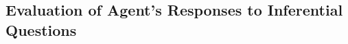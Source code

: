 \documentclass[11pt]{article}
\begin{document}










\subsection{Evaluation of Agent's Responses to Inferential Questions}
\end{document}
